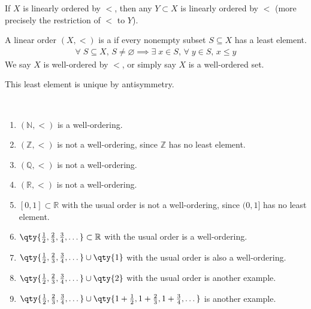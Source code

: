 \begin{note}
    If $X$ is linearly ordered by $<$, then any $Y \subset X$ is linearly ordered by $<$ (more precisely the restriction of $<$ to $Y$).
\end{note}

\begin{definition}
    A linear order $(X, <)$ is a  if every nonempty subset $S \subseteq X$ has a least element.
    \begin{align*}
       \forall \; S \subseteq X,\, S \neq \varnothing \implies \exists \; x \in S,\, \forall \; y \in S,\, x \leq y
    \end{align*}
    We say $X$ is well-ordered by $<$, or simply say $X$ is a well-ordered set.
\end{definition}

\begin{note}
    This least element is unique by antisymmetry.
\end{note}

\begin{example} ~\vspace*{-1.5\baselineskip}
    \begin{enumerate}
        \item $(\mathbb N, <)$ is a well-ordering.
        \item $(\mathbb Z, <)$ is not a well-ordering, since $\mathbb Z$ has no least element.
        \item $(\mathbb Q, <)$ is not a well-ordering.
        \item $(\mathbb R, <)$ is not a well-ordering.
        \item $[0,1] \subset \mathbb R$ with the usual order is not a well-ordering, since $(0,1]$ has no least element.
        \item $\qty{\frac{1}{2}, \frac{2}{3}, \frac{3}{4}, \dots} \subset \mathbb R$ with the usual order is a well-ordering.
        \item $\qty{\frac{1}{2}, \frac{2}{3}, \frac{3}{4}, \dots} \cup \qty{1}$ with the usual order is also a well-ordering.
        \item $\qty{\frac{1}{2}, \frac{2}{3}, \frac{3}{4}, \dots} \cup \qty{2}$ with the usual order is another example.
        \item $\qty{\frac{1}{2}, \frac{2}{3}, \frac{3}{4}, \dots} \cup \qty{1 + \frac{1}{2}, 1 + \frac{2}{3}, 1 + \frac{3}{4}, \dots}$ is another example.
    \end{enumerate}
\end{example}

